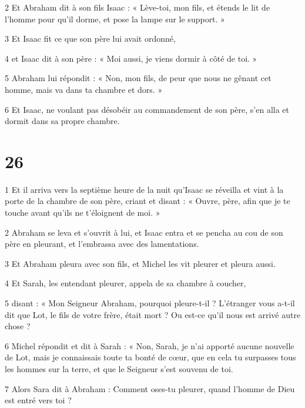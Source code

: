 \par 2 Et Abraham dit à son fils Isaac : « Lève-toi, mon fils, et étends le lit de l'homme pour qu'il dorme, et pose la lampe sur le support. »

\par 3 Et Isaac fit ce que son père lui avait ordonné,

\par 4 et Isaac dit à son père : « Moi aussi, je viens dormir à côté de toi. »

\par 5 Abraham lui répondit : « Non, mon fils, de peur que nous ne gênant cet homme, mais va dans ta chambre et dors. »

\par 6 Et Isaac, ne voulant pas désobéir au commandement de son père, s'en alla et dormit dans sa propre chambre.

\chapter{26}

\par 1 Et il arriva vers la septième heure de la nuit qu'Isaac se réveilla et vint à la porte de la chambre de son père, criant et disant : « Ouvre, père, afin que je te touche avant qu'ils ne t'éloignent de moi. »

\par 2 Abraham se leva et s'ouvrit à lui, et Isaac entra et se pencha au cou de son père en pleurant, et l'embrassa avec des lamentations.

\par 3 Et Abraham pleura avec son fils, et Michel les vit pleurer et pleura aussi.

\par 4 Et Sarah, les entendant pleurer, appela de sa chambre à coucher,

\par 5 disant : « Mon Seigneur Abraham, pourquoi pleure-t-il ? L'étranger vous a-t-il dit que Lot, le fils de votre frère, était mort ? Ou est-ce qu’il nous est arrivé autre chose ?

\par 6 Michel répondit et dit à Sarah : « Non, Sarah, je n'ai apporté aucune nouvelle de Lot, mais je connaissais toute ta bonté de cœur, que en cela tu surpasses tous les hommes sur la terre, et que le Seigneur s'est souvenu de toi.

\par 7 Alors Sara dit à Abraham : Comment oses-tu pleurer, quand l'homme de Dieu est entré vers toi ?

